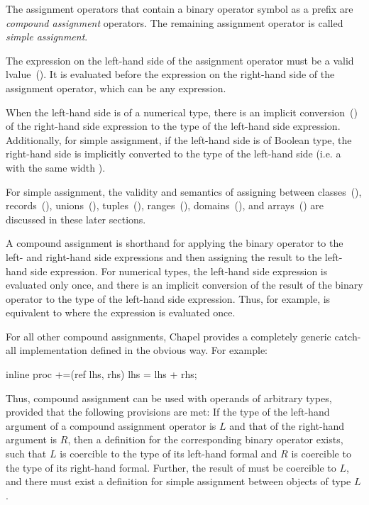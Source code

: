 The assignment operators that contain a binary operator symbol as a prefix
are \emph{compound assignment} operators.  The remaining assignment
operator \chpl{=} is called \emph{simple assignment}.

The expression on the left-hand side of the assignment operator must
be a valid lvalue~().  It is evaluated before the
expression on the right-hand side of the assignment operator, which
can be any expression.

When the left-hand side is of a numerical type, there is
an implicit conversion~()
of the right-hand side expression
to the type of the left-hand side expression.  Additionally, for simple
assignment, if the left-hand side is of Boolean type, the right-hand side is
implicitly converted to the type of the left-hand side (i.e. a 
with the same width ).

For simple assignment, the validity and semantics of assigning between
classes~(), records~(),
unions~(), tuples~(),
ranges~(),
domains~(), and arrays~()
are discussed in these later sections.

A compound assignment is
shorthand for applying the binary operator to the left- and
right-hand side expressions and then assigning the result
to the left-hand side expression.
For numerical types, the left-hand side expression is evaluated only once,
and there is an implicit conversion of the result of the binary operator
to the type of the left-hand side expression.  Thus, for
example,  is equivalent to  where the
expression  is evaluated once.

For all other compound assignments, Chapel provides a completely generic
catch-all implementation defined in the obvious way.  For example:

\begin{chapel}
inline proc +=(ref lhs, rhs) {
  lhs = lhs + rhs;
}
\end{chapel}

Thus, compound assignment can be used with operands of arbitrary types,
provided that the following provisions are met: If the type of the left-hand
argument of a compound assignment operator  is $L$ and that of the
right-hand argument is $R$, then a definition for the corresponding binary
operator  exists, such that $L$ is coercible to the type of its
left-hand formal and $R$ is coercible to the type of its right-hand formal.
Further, the result of  must be coercible to $L$, and there must exist
a definition for simple assignment between objects of type $L$.

